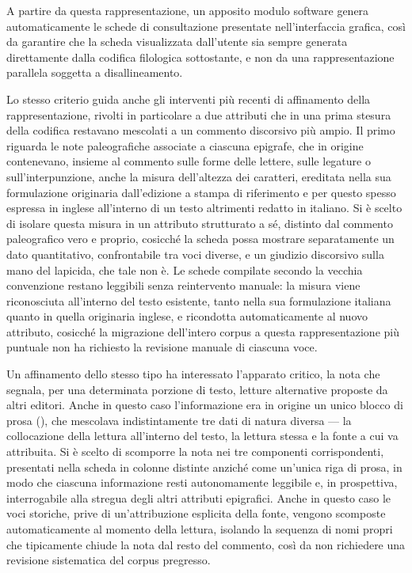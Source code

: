\documentclass[11pt,a4paper]{article}
\begin{document}
A partire da questa rappresentazione, un apposito modulo software
genera automaticamente le schede di consultazione presentate
nell'interfaccia grafica, così da garantire che la scheda visualizzata
dall'utente sia sempre generata direttamente dalla codifica filologica
sottostante, e non da una rappresentazione parallela soggetta a
disallineamento.

Lo stesso criterio guida anche gli interventi più recenti di
affinamento della rappresentazione, rivolti in particolare a due
attributi che in una prima stesura della codifica restavano mescolati
a un commento discorsivo più ampio. Il primo riguarda le note
paleografiche associate a ciascuna epigrafe, che in origine
contenevano, insieme al commento sulle forme delle lettere, sulle
legature o sull'interpunzione, anche la misura dell'altezza dei
caratteri, ereditata nella sua formulazione originaria dall'edizione a
stampa di riferimento e per questo spesso espressa in inglese
all'interno di un testo altrimenti redatto in italiano. Si è scelto di
isolare questa misura in un attributo strutturato a sé, distinto dal
commento paleografico vero e proprio, cosicché la scheda possa
mostrare separatamente un dato quantitativo, confrontabile tra voci
diverse, e un giudizio discorsivo sulla mano del lapicida, che tale
non è. Le schede compilate secondo la vecchia convenzione restano
leggibili senza reintervento manuale: la misura viene riconosciuta
all'interno del testo esistente, tanto nella sua formulazione italiana
quanto in quella originaria inglese, e ricondotta automaticamente al
nuovo attributo, cosicché la migrazione dell'intero corpus a questa
rappresentazione più puntuale non ha richiesto la revisione manuale di
ciascuna voce.

Un affinamento dello stesso tipo ha interessato l'apparato critico, la
nota che segnala, per una determinata porzione di testo, letture
alternative proposte da altri editori. Anche in questo caso
l'informazione era in origine un unico blocco di prosa (), che mescolava indistintamente tre dati di
natura diversa --- la collocazione della lettura all'interno del
testo, la lettura stessa e la fonte a cui va attribuita. Si è scelto
di scomporre la nota nei tre componenti corrispondenti, presentati
nella scheda in colonne distinte anziché come un'unica riga di prosa,
in modo che ciascuna informazione resti autonomamente leggibile e, in
prospettiva, interrogabile alla stregua degli altri attributi
epigrafici. Anche in questo caso le voci storiche, prive di
un'attribuzione esplicita della fonte, vengono scomposte
automaticamente al momento della lettura, isolando la sequenza di nomi
propri che tipicamente chiude la nota dal resto del commento, così da
non richiedere una revisione sistematica del corpus pregresso.
\end{document}
